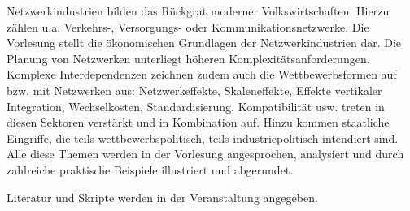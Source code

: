 \begin{course}
\begin{content}
Netzwerkindustrien bilden das Rückgrat moderner Volkswirtschaften. Hierzu zählen u.a. Verkehrs-, Versorgungs- oder Kommunikationsnetzwerke. Die Vorlesung stellt die ökonomischen Grundlagen der Netzwerkindustrien dar. Die Planung von Netzwerken unterliegt höheren Komplexitätsanforderungen. Komplexe Interdependenzen zeichnen zudem auch die Wettbewerbsformen auf bzw. mit Netzwerken aus: Netzwerkeffekte, Skaleneffekte, Effekte vertikaler Integration, Wechselkosten, Standardisierung, Kompatibilität usw. treten in diesen Sektoren verstärkt und in Kombination auf. Hinzu kommen staatliche Eingriffe, die teils wettbewerbspolitisch, teils industriepolitisch intendiert sind. Alle diese Themen werden in der Vorlesung angesprochen, analysiert und durch zahlreiche praktische Beispiele illustriert und abgerundet.


\end{content}



\begin{literature}Literatur und Skripte werden in der Veranstaltung angegeben.

\end{literature}



\end{course}